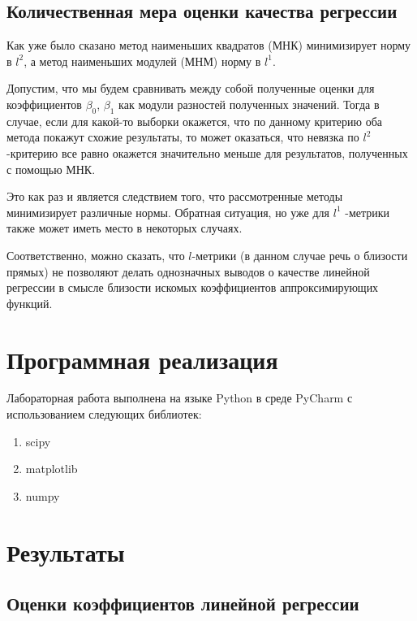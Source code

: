 \documentclass[a4paper]{article}
\begin{document}
        \subsection{Количественная мера оценки качества регрессии}
            Как уже было сказано метод наименьших квадратов (МНК) минимизирует норму в $l^2$, а метод наименьших модулей (МНМ) норму в $l^1$.

            Допустим, что мы будем сравнивать между собой полученные оценки для коэффициентов $\beta_0$, $\beta_1$ как модули разностей полученных значений.
            Тогда в случае, если для какой-то выборки окажется, что по данному критерию оба метода покажут схожие результаты, то может оказаться, что
            невязка по  $l^2$ -критерию все равно окажется значительно меньше для результатов, полученных с помощью МНК.

            Это как раз и является следствием того, что рассмотренные методы минимизирует различные нормы. Обратная ситуация, но уже для  $l^1$ -метрики также может иметь место в некоторых случаях.

            Соответственно, можно сказать, что $l$-метрики (в данном случае речь о близости прямых) не позволяют делать однозначных выводов о качестве линейной регрессии в смысле близости искомых коэффициентов аппроксимирующих функций.

    \section{Программная реализация}
    Лабораторная работа выполнена на языке Python в среде PyCharm с использованием следующих библиотек:
 \begin{enumerate}
        \item scipy
        \item matplotlib
        \item numpy
    \end{enumerate}

    \section{Результаты}
        \subsection{Оценки коэффициентов линейной регрессии}
\end{document}
